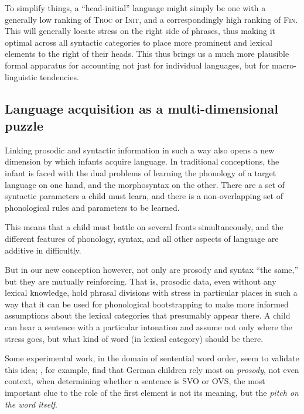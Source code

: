 \documentclass{article}
\newcommand{\finphi}{\textsc{Fin\textphi}}
\newcommand{\initphi}{\textsc{Init\textphi}}
\newcommand{\troc}{\textsc{Troc}}
\begin{document}
To simplify things, a ``head-initial'' language might simply be one with a generally low ranking of {\troc} or {\initphi}, and a correspondingly high ranking of {\finphi}.
This will generally locate stress on the right side of phrases, thus making it optimal across all syntactic categories to place more prominent and lexical elements to the right of their heads.
This thus brings us a much more plausible formal apparatus for accounting not just for individual languages, but for macro-linguistic tendencies.

\subsection{Language acquisition as a multi-dimensional puzzle}

Linking prosodic and syntactic information in such a way also opens a new dimension by which infants acquire language.
In traditional conceptions, the infant is faced with the dual problems of learning the phonology of a target language on one hand, and the morphosyntax on the other.
There are a set of syntactic parameters a child must learn, and there is a non-overlapping set of phonological rules and parameters to be learned.

This means that a child must battle on several fronts simultaneously, and the different features of phonology, syntax, and all other aspects of language are additive in difficultly.

But in our new conception however, not only are prosody and syntax ``the same,'' but they are mutually reinforcing.
That is, prosodic data, even without any lexical knowledge, hold phrasal divisions with stress in particular places in such a way that it can be used for phonological bootstrapping to make more informed assumptions about the lexical categories that presumably appear there.
A child can hear a sentence with a particular intonation and assume not only where the stress goes, but what kind of word (in lexical category) should be there.

Some experimental work, in the domain of sentential word order, seem to validate this idea; \textcite{grunloh11}, for example, find that German children rely most on \emph{prosody}, not even context, when determining whether a sentence is SVO or OVS, the most important clue to the role of the first element is not its meaning, but the \emph{pitch on the word itself}.
\end{document}
